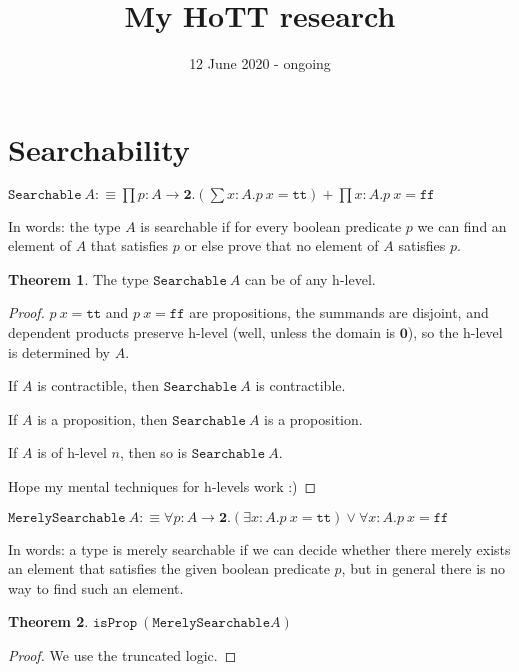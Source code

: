 \documentclass[11pt]{article}
\title{My HoTT research}
\date{12 June 2020 - ongoing}
\theoremstyle{definition}
\newtheorem{theorem}{Theorem}[section]
\newcommand{\txt}[1]{\texttt{#1}}
\newcommand{\text}[1]{\texttt{#1}}
\renewcommand{\(}{\left(}
\renewcommand{\)}{\right)}
\newcommand{\defn}{:\equiv}
\newcommand{\isProp}{\text{isProp}}
\newcommand{\apl}[2]{#1\ #2}
\newcommand{\Empty}{\mathbf{0}}
\newcommand{\Bool}{\mathbf{2}}
\newcommand{\true}{\txt{tt}}
\newcommand{\false}{\txt{ff}}
\newcommand{\dprod}[2]{\prod #1.#2}
\newcommand{\dsum}[2]{\sum #1.#2}
\newcommand{\all}[2]{\forall #1.#2}
\newcommand{\ex}[2]{\exists #1.#2}
\begin{document}
\maketitle

\section{Searchability}

\newcommand{\Searchable}{\txt{Searchable}}

\begin{center}
$\displaystyle \apl{\Searchable}{A} \defn \dprod{p : A \to \Bool}{\(\dsum{x : A}{\apl{p}{x} = \true}\) + \dprod{x : A}{\apl{p}{x} = \false}}$
\end{center}

In words: the type $A$ is searchable if for every boolean predicate $p$ we can find an element of $A$ that satisfies $p$ or else prove that no element of $A$ satisfies $p$.

\begin{theorem}
The type $\apl{\Searchable}{A}$ can be of any h-level.
\end{theorem}
\begin{proof}
$\apl{p}{x} = \true$ and $\apl{p}{x} = \false$ are propositions, the summands are disjoint, and dependent products preserve h-level (well, unless the domain is $\Empty$), so the h-level is determined by $A$.

If $A$ is contractible, then $\apl{\Searchable}{A}$ is contractible.

If $A$ is a proposition, then $\apl{\Searchable}{A}$ is a proposition.

If $A$ is of h-level $n$, then so is $\apl{\Searchable}{A}$.

Hope my mental techniques for h-levels work :)

\end{proof}

\newcommand{\MerelySearchable}{\txt{MerelySearchable}}
\begin{center}
$\displaystyle \apl{\MerelySearchable}{A} \defn \all{p : A \to \Bool}{\(\ex{x : A}{\apl{p}{x} = \true}\) \lor \all{x : A}{\apl{p}{x} = \false}}$
\end{center}

In words: a type is merely searchable if we can decide whether there merely exists an element that satisfies the given boolean predicate $p$, but in general there is no way to find such an element.

\begin{theorem}
$\apl{\isProp}{(\MerelySearchable{A})}$
\end{theorem}
\begin{proof}
We use the truncated logic.
\end{proof}
\end{document}
